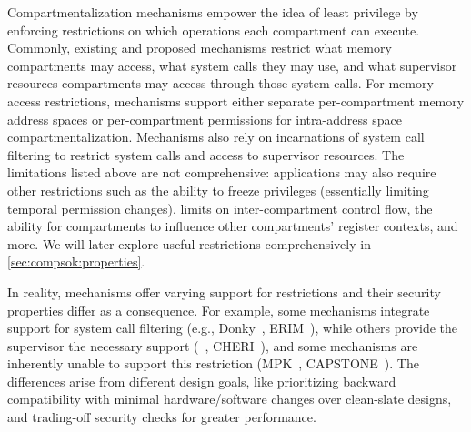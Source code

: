 Compartmentalization mechanisms empower the idea of least privilege by 
enforcing restrictions on which operations each compartment can execute.
Commonly, existing and proposed mechanisms restrict what 
memory compartments may access, what system calls they may use, 
and what supervisor resources compartments may access through those system calls.
For memory access restrictions, mechanisms support either 
separate per-compartment memory address spaces or
per-compartment permissions for intra-address space compartmentalization.
Mechanisms also rely on incarnations of system call filtering to
restrict system calls and access to supervisor resources.
The limitations listed above are not comprehensive: applications may
also require other restrictions such as 
the ability to freeze privileges (essentially limiting temporal permission changes), 
limits on inter-compartment control flow,
the ability for compartments to influence other compartments' register contexts, 
and more.
We will later explore useful restrictions comprehensively in 
\autoref{sec:compsok:properties}.

In reality, mechanisms offer varying support for restrictions
and their security properties differ as a consequence.
For example, some mechanisms integrate support for system call filtering 
(e.g., Donky~\cite{SchrammelWSS0MG20Donky}, ERIM~\cite{ERIMOberwagner19}), while
others provide the supervisor the necessary support (\seccells~\cite{BhattacharyyaHLGSFP23}, 
CHERI~\cite{WatsonWNMACDDGL15}),
and some mechanisms are inherently unable to support this restriction (MPK~\cite{ParkLXMK19}, 
CAPSTONE~\cite{YuWBCS23CAPSTONE}).
The differences arise from different design goals, like prioritizing backward 
compatibility with minimal hardware/software changes over clean-slate designs,
and trading-off security checks for greater performance.

